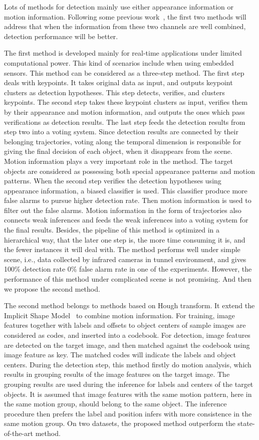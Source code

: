   Lots of methods for detection mainly use either appearance information or motion information. Following some previous work~\citep{pvm},  the first two methods will address that when the information from these two channels are well combined, detection performance will be better.


 The first method is developed mainly for real-time applications under limited computational power. This kind of scenarios include when using embedded sensors. This method can be considered as a three-step method. The first step deals with keypoints. It
takes original data as input, and outputs keypoint clusters as detection hypotheses. This step detects, verifies, and clusters keypoints. The second
step takes these keypoint clusters as input, verifies them by their appearance and motion
information, and outputs the ones which pass verifications as detection results. The last step feeds the detection results from step two into a voting system. Since detection results are connected by their belonging trajectories, voting along the temporal dimension is responsible for giving the final decision of  each object,  when it disappears from the scene.   Motion information plays a very important role in the method. The target objects are considered as possessing both special appearance patterns and motion patterns. When the second step verifies the detection hypotheses using appearance information, a biased classifier is used. This classifier produce more false alarms to pursue higher detection rate. Then motion information is used to filter out the false alarms. Motion information in the form of trajectories also connects weak inferences and feeds the weak inferences into a voting system for the final results. Besides, the pipeline of this method is optimized in a hierarchical way, that the later one step is, the more time consuming it is, and the fewer instances it will deal with. The method performs well under simple scene, i.e., data collected by infrared cameras in tunnel environment, and gives 100\% detection rate 0\% false alarm rate in one of the experiments. However, the performance of this method under complicated scene is not promising. And then we propose the second method.

The second method belongs to methods based on Hough transform. It extend the Implicit Shape Model~\citep{lb1} to combine motion information. For training, image features together with labels and offsets to object centers of sample images are considered as codes, and inserted into a codebook. For detection, image features are detected on the target image, and then matched against the codebook using image feature as key. The matched codes will indicate the labels and object centers. During the detection step, this method firstly do motion analysis, which results in grouping results of the image features on the target image. The grouping results are used during the inference for labels and centers of the target objects. It is assumed that image features with the same motion pattern, here in the same motion group, should belong to the same object. The inference procedure then prefers the label and position infers with more consistence in the same motion group. On two datasets, the proposed method outperform the state-of-the-art method.

